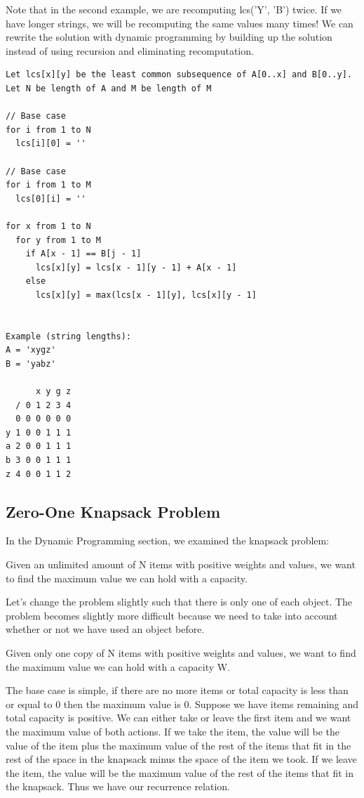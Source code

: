 \documentclass[11pt,oneside]{book}
\begin{document}
Note that in the second example, we are recomputing lcs('Y', 'B') twice. If we have longer strings, we will be recomputing the same values many times! We can rewrite the solution with dynamic programming by building up the solution instead of using recursion and eliminating recomputation.

\begin{lstlisting}
Let lcs[x][y] be the least common subsequence of A[0..x] and B[0..y].
Let N be length of A and M be length of M

// Base case
for i from 1 to N
  lcs[i][0] = ''

// Base case
for i from 1 to M
  lcs[0][i] = ''

for x from 1 to N
  for y from 1 to M
    if A[x - 1] == B[j - 1]
      lcs[x][y] = lcs[x - 1][y - 1] + A[x - 1]
    else
      lcs[x][y] = max(lcs[x - 1][y], lcs[x][y - 1]


Example (string lengths):
A = 'xygz'
B = 'yabz'

      x y g z
  / 0 1 2 3 4
  0 0 0 0 0 0
y 1 0 0 1 1 1
a 2 0 0 1 1 1
b 3 0 0 1 1 1
z 4 0 0 1 1 2
\end{lstlisting}



\subsection{Zero-One Knapsack Problem}

In the Dynamic Programming section, we examined the knapsack problem:

Given an unlimited amount of N items with positive weights and values, we want to find the maximum value we can hold with a capacity.

Let's change the problem slightly such that there is only one of each object. The problem becomes slightly more difficult because we need to take into account whether or not we have used an object before.

Given only one copy of N items with positive weights and values, we want to find the maximum value we can hold with a capacity W.

The base case is simple, if there are no more items or total capacity is less than or equal to 0 then the maximum value is 0. Suppose we have items remaining and total capacity is positive. We can either take or leave the first item and we want the maximum value of both actions. If we take the item, the value will be the value of the item plus the maximum value of the rest of the items that fit in the rest of the space in the knapsack minus the space of the item we took. If we leave the item, the value will be the maximum value of the rest of the items that fit in the knapsack. Thus we have our recurrence relation.
\end{document}

